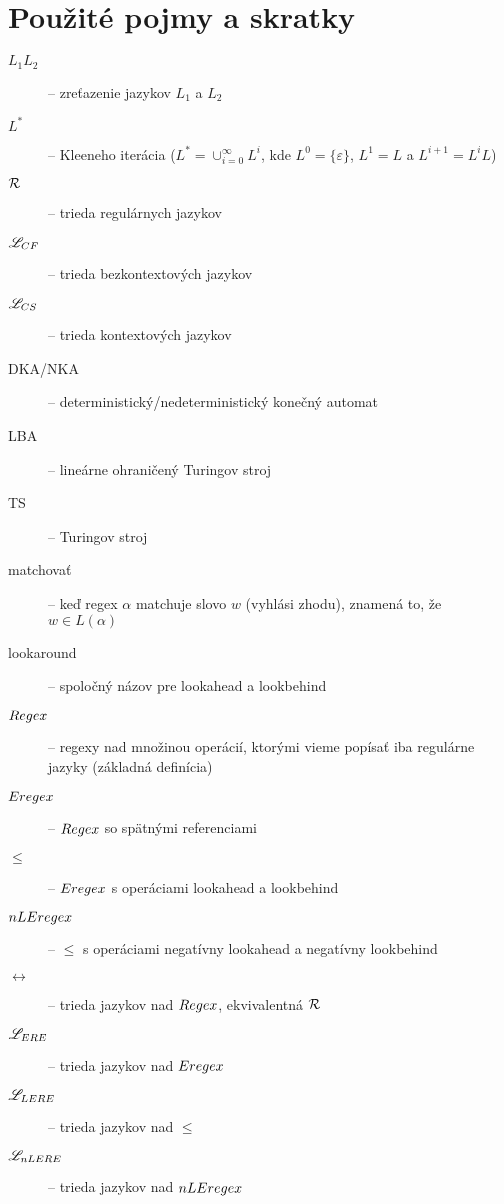 \chapter*{Použité pojmy a skratky}
\label{chap:pojmy}
{}

\begin{description}
\item[$ L_{1}L_{2} $] -- zreťazenie jazykov $ L_{1} $ a $ L_{2} $
\item[$ L^* $] -- Kleeneho iterácia ($L^*=\cup^{\infty}_{i=0}L^i$, kde $L^0=\lbrace \varepsilon \rbrace$, $L^1=L$ a $L^{i+1}=L^iL$)
\item[$ {\cal R} $] -- trieda regulárnych jazykov
\item[$ \mathscr{L}_{CF}$] -- trieda bezkontextových jazykov
\item[$ \mathscr{L}_{CS}$] -- trieda kontextových jazykov
\item[DKA/NKA] -- deterministický/nedeterministický konečný automat
\item[LBA] -- lineárne ohraničený Turingov stroj
\item[TS] -- Turingov stroj
\item[matchovať] -- keď regex $\alpha$ matchuje slovo $w$ (vyhlási zhodu), znamená to, že $w\in L(\alpha)$
\item[lookaround] -- spoločný názov pre lookahead a lookbehind

\item[$Regex$] -- regexy nad množinou operácií, ktorými vieme popísať iba regulárne jazyky (základná definícia)
\item[$Eregex$] -- $Regex$ so spätnými referenciami
\item[$\le$] -- $Eregex$ s operáciami lookahead a lookbehind
\item[$nLEregex$] -- $\le$ s operáciami negatívny lookahead a negatívny lookbehind
\item[$\rel$] -- trieda jazykov nad $Regex$, ekvivalentná ${\cal R}$
\item[$\mathscr{L}_{ERE}$] -- trieda jazykov nad $Eregex$
\item[$\mathscr{L}_{LERE}$] -- trieda jazykov nad $\le$
\item[$\mathscr{L}_{nLERE}$] -- trieda jazykov nad $nLEregex$
\end{description}